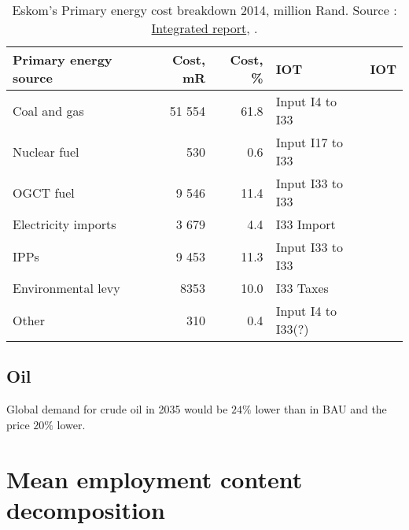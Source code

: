 \documentclass[12pt,english]{article}
\begin{document}
\begin{table}[ht]
	\centering
	\begin{tabular}{lrrlr}
		\toprule
		Primary energy source	& Cost, mR  & Cost, \% & IOT  & IOT\\ 
		\midrule
		Coal and gas & 51 554   &  61.8   & Input I4 to I33 &\\
		Nuclear  fuel &  530  &   0.6  & Input I17 to I33& \\
		OGCT fuel & 9 546   &   11.4   & Input I33 to I33  & \\
		Electricity  imports & 3 679   &  4.4  & I33 Import & \\
		IPPs &  9 453  &  11.3  & Input I33 to I33 & \\
		Environmental levy & 8353 &   10.0   & I33 Taxes & \\
		Other &  310  &  0.4  & Input I4 to I33(?) 	& \\
		\bottomrule
	\end{tabular}
	\caption{\label{EskomPrimaryEnergy}Eskom's Primary energy cost breakdown 2014, million Rand. Source : \href{http://www.eskom.co.za/IR2015/Documents/EskomIR2015single.pdf}{Integrated report}, \citep{Eskom2014AR}.}
\end{table}




\subsection{Oil}

Global demand for crude oil in 2035 would be $24\%$ lower than in BAU and the price $20\%$ lower. 




\clearpage

\newpage


\clearpage

\appendix

\section{Mean employment content decomposition} \label{ECmean}

\end{document}
